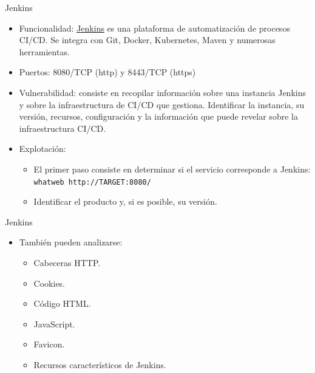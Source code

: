 \documentclass[aspectratio=169,11pt]{beamer}
\newcommand{\cmd}[1]{\texttt{#1}}
\begin{document}
\begin{frame}{Jenkins}
   \begin{itemize} 
    \item Funcionalidad: \href{https://www.jenkins.io/}{Jenkins} es una plataforma de automatización de procesos CI/CD. Se integra con Git, Docker, Kubernetes, Maven y numerosas herramientas. 
    \item Puertos: 8080/TCP (http) y 8443/TCP (https)
    \item Vulnerabilidad: consiste en recopilar información sobre una instancia Jenkins y sobre la infraestructura de CI/CD que gestiona. Identificar la instancia, su versión, recursos, configuración y la información que puede revelar sobre la infraestructura CI/CD. 
     \item Explotación:
     \begin{itemize} 
    \item El primer paso consiste en determinar si el servicio corresponde a Jenkins:\\
 \cmd{whatweb http://TARGET:8080/}
        \item Identificar el producto y, si es posible, su versión.

  \end{itemize} 
  \end{itemize} 
  \vspace{0.4cm} 
\end{frame} 

\begin{frame}{Jenkins} 
\small
   \begin{itemize} 
  \item También pueden analizarse: 
  \begin{itemize} 
    \item Cabeceras HTTP. \item Cookies. \item Código HTML. \item JavaScript. \item Favicon. \item Recursos característicos de Jenkins. \end{itemize} 
     
\end{itemize} 
 \end{frame} 
\end{document}

